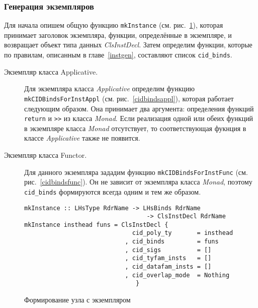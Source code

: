 \subsubsection{Генерация экземпляров}
Для начала опишем общую функцию \lstinline{mkInstance} (см. рис.~\ref{mkinst}), которая принимает заголовок экземпляра, функции, определённые в экземпляре, и возвращает объект типа данных \textit{ClsInstDecl}.
Затем определим функции, которые по правилам, описанным в главе~\ref{instgen}, составляют список \lstinline{cid_binds}.
\begin{description}
\item[Экземпляр класса Applicative.] Для экземпляра класса \textit{Applicative} определим функцию \lstinline{mkCIDBindsForInstAppl} (см. рис.~\ref{cidbindsappl}), которая работает следующим образом. Она принимает два аргумента: определения функций \lstinline{return} и \lstinline{>>} из класса \textit{Monad}. Если реализация одной или обеих функций в экземпляре класса \textit{Monad} отсутствует, то соответствующая фукнция в классе \textit{Applicative} также не появится.
\item[Экземпляр класса Functor.] Для данного экземпляра зададим функцию \lstinline{mkCIDBindsForInstFunc} (см. рис.~\ref{cidbindsfunc}). Он не зависит от экземпляра класса \textit{Monad}, поэтому \lstinline{cid_binds} формируются всегда одним и тем же образом.
\end{description}

\begin{figure}[h]
\hrulefill
\begin{lstlisting}
mkInstance :: LHsType RdrName -> LHsBinds RdrName
                                  -> ClsInstDecl RdrName
mkInstance insthead funs = ClsInstDecl { 
                              cid_poly_ty       = insthead
                            , cid_binds         = funs
                            , cid_sigs          = []
                            , cid_tyfam_insts   = []
                            , cid_datafam_insts = []
                            , cid_overlap_mode  = Nothing
                               }
\end{lstlisting}
\hrulefill
\caption{Формирование узла с экземпляром}\label{mkinst}
\end{figure}

